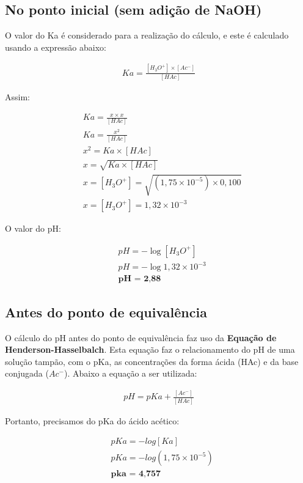 \documentclass[a4paper, 12pt]{article}
\begin{document}
\subsection{No ponto inicial (sem adição de NaOH)}
O valor do Ka é considerado para a realização do cálculo, e este é calculado usando a expressão abaixo:
\begin{fleqn}
\begin{align*}
	Ka = \frac{[H_{3}O^{+}] \times [Ac^{-}]}{[HAc]}
\end{align*}
\end{fleqn}
Assim:
\begin{fleqn}
\begin{align*}
	& Ka = \frac{x \times x}{[HAc]} \\
	& Ka = \frac{x^{2}}{[HAc]} \\
	& x^{2} = Ka \times [HAc] \\
	& x = \sqrt{Ka \times [HAc]} \\
	& x = [H_{3}O^{+}] = \sqrt{(1,75 \times 10^{-5}) \times 0,100} \\
	& x = [H_{3}O^{+}] = 1,32 \times 10^{-3}
\end{align*}
\end{fleqn}
O valor do pH:
\begin{fleqn}
\begin{align*}
	& pH = - \log [H_{3}O^{+}] \\
	& pH = - \log {1,32 \times 10^{-3}} \\
	& \textbf{pH = 2,88}
\end{align*}
\end{fleqn}

\subsection{Antes do ponto de equivalência}
O cálculo do pH antes do ponto de equivalência faz uso da \textbf{Equação de Henderson-Hasselbalch}. Esta equação faz o relacionamento do pH de uma solução tampão, com o pKa, as concentrações da forma ácida (HAc) e da base conjugada ($Ac^{-}$). Abaixo a equação a ser utilizada:
\begin{fleqn}
\begin{align*}
	pH = pKa + \frac{[Ac^{-}]}{[HAc]}
\end{align*}
\end{fleqn}
Portanto, precisamos do pKa do ácido acético:
\begin{fleqn}
\begin{align*}
	& pKa = -log [Ka] \\
	& pKa = -log (1,75 \times 10^{-5}) \\
	& \textbf{pka = 4,757}
\end{align*}
\end{fleqn}
\end{document}
